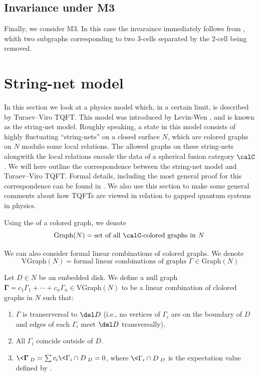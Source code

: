 \subsection*{Invariance under M3}
Finally, we consider M3. In this case the invaraince immediately follows
from , whith  two subgraphs corresponding to two 3-cells
separated by the 2-cell being removed.


\section{String-net model}\label{s:stringnet}


In this section we look at a physics model which, in a certain limit, is described 
by Turaev--Viro TQFT. This model was introduced  by Levin-Wen \cite{levin-wen}, 
and is known as the string-net model. Roughly speaking, a state in this model
consists of highly fluctuating ``string-nets'' on a closed surface $N$, which are  
colored graphs on $N$ modulo some local relations. The allowed graphs
on these string-nets alongwith the local relations encode the data of a spherical
fusion category $\calC$.  We will here outline the correspondence between the string-net
 model and Turaev--Viro TQFT. Formal details, including the most
general proof for this correspondence can be found in \cite{kirillov-stringnet}. 
We also use this section to make some general comments about how TQFTs are viewed
in relation to gapped quantum systems in physics.


Using the  of a colored graph, we denote
  $$
\mathrm{Graph}(N)=\text{set of all $\calC$-colored graphs in $N$ }
$$

We can also consider formal linear combinations of colored graphs. 
We denote
 $$
\mathrm{VGraph}(N)=\text{formal linear combinations of graphs }\Gamma \in \mathrm{Graph}(N) 
$$

\begin{definition}\label{d:null-graph}
	Let $D \in N$ be an embedded disk. We define a null graph $\boldsymbol{\Gamma} = c_1 \Gamma_1 + \cdots + c_n \Gamma_n 
	\in \mathrm{VGraph}(N)$ to be a linear combination of clolored graphs in $N$ such that:
	\begin{enumerate}
		\item $\Gamma$ is transerversal to $\del D$ (i.e., no vertices of $\Gamma_i$ are on the boundary 
		of $D$ and edges of each $\Gamma_i$ meet $\del D$ transversally).
		\item  All $\Gamma_i$ coincide outside of $D$.
		\item $\< \boldsymbol{\Gamma} \>_D = \sum c_i \< \Gamma_i \cap D \>_D =0$, where 
		$ \< \Gamma_i \cap D \>_D$ is the expectation value defined by .
	\end{enumerate}
\end{definition}

